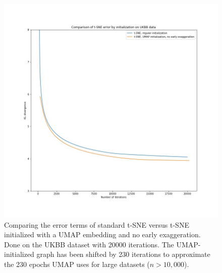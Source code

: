 \documentclass[12pt]{pnas-new}
\begin{document}
\begin{figure}[!htb]
    \centering
    \includegraphics[width=0.95\columnwidth]{images/tsne_umap_graph_ukbb.jpeg}
    \caption{Comparing the error terms of standard t-SNE versus t-SNE initialized with a UMAP embedding and no early exaggeration. Done on the UKBB dataset with 20000 iterations. The UMAP-initialized graph has been shifted by 230 iterations to approximate the 230 epochs UMAP uses for large datasets ($n>10,000$).}
    \label{fig:supp_tsne_umap_compare_ukbb_graph}
\end{figure}
\end{document}
